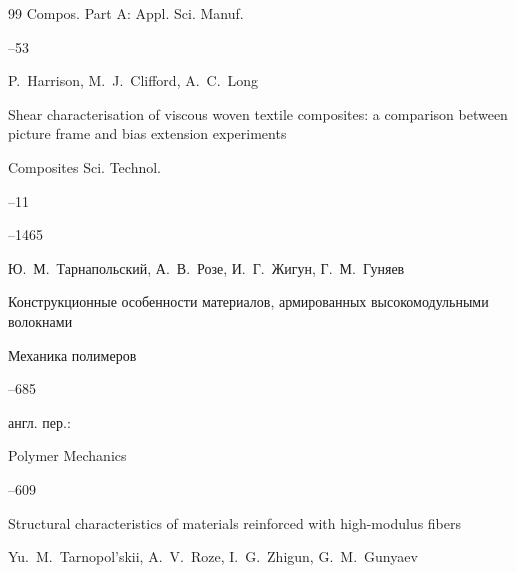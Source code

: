 \begin{thebibliography}{99}
 \jour Compos. Part A: Appl. Sci. Manuf.




 --53




 \by P.~Harrison, M.~J.~Clifford, A.~C.~Long 

 \paper Shear characterisation of viscous woven textile composites: a comparison between picture frame and bias extension experiments

 \jour Composites Sci. Technol.



 --11

 --1465












 \by Ю.~М.~Тарнапольский, А.~В.~Розе, И.~Г.~Жигун, Г.~М.~Гуняев

 \paper Конструкционные особенности материалов, армированных высокомодульными волокнами

 \jour Механика полимеров



 --685

 \transl англ. пер.:~

 \jour Polymer Mechanics




--609

\paper Structural characteristics of materials reinforced with high-modulus fibers

\by Yu.~M.~Tarnopol'skii, A.~V.~Roze, I.~G.~Zhigun, G.~M.~Gunyaev 



\end{thebibliography}





